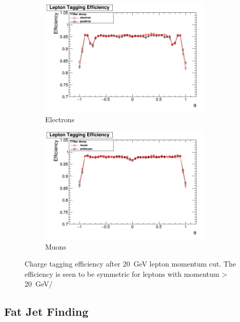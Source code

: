 \begin{figure}
  \centering
  \begin{subfigure}{.5\textwidth}
    \centering
    \includegraphics[width=0.9\textwidth]{figures/ElectronEfficiencys_20GeVCut.png}
    \caption[Charge Tagging Efficiency]{Electrons}
  \end{subfigure}%
  \begin{subfigure}{.5\textwidth}
    \centering
    \includegraphics[width=0.9\textwidth]{figures/MuonEfficiencys_20GeVMCCut.png}
    \caption[Charge Tagging Efficiency]{Muons}
  \end{subfigure}
  \caption[Charge Tagging Efficiency After 20GeV Lepton Momentum Cut]{Charge tagging efficiency after 20~GeV lepton momentum cut. The efficiency is seen to be symmetric for leptons with momentum > 20~GeV/}
  \label{fig:effienciesWithCuts}
\end{figure}


\subsection{Fat Jet Finding}

